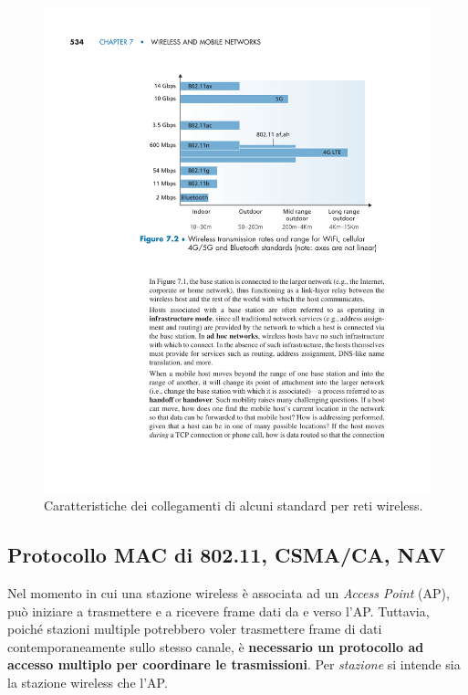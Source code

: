 \documentclass[a4paper]{article}
\begin{document}
	\begin{figure}[!htp]
		\centering
		\includegraphics[width=\textwidth]{img/paragoni_velocita.pdf}
		\caption{Caratteristiche dei collegamenti di alcuni standard per reti wireless.}
		\label{velocità collegamenti}
	\end{figure}\newpage

	\subsection{Protocollo MAC di 802.11, CSMA/CA, NAV}
	
	Nel momento in cui una stazione wireless è associata ad un \emph{Access Point} (AP), può iniziare a trasmettere e a ricevere frame dati da e verso l’AP. Tuttavia, poiché stazioni multiple potrebbero voler trasmettere frame di dati contemporaneamente sullo stesso canale, è \textbf{necessario un protocollo ad accesso multiplo per coordinare le trasmissioni}. Per \emph{stazione} si intende sia la stazione wireless che l’AP.\newline
	
\end{document}
